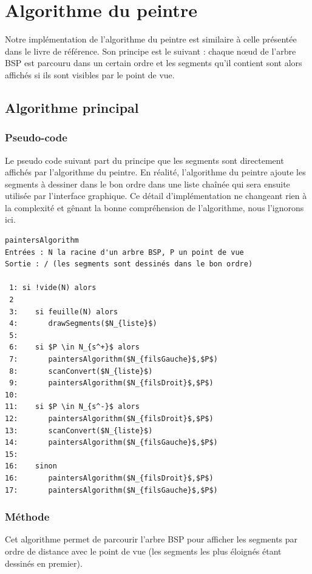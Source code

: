 \documentclass[11pt,a4paper]{article}
\theoremstyle{definition}
\theoremstyle{remark}
\begin{document}
\newpage

\section{Algorithme du peintre}

Notre implémentation de l'algorithme du peintre est similaire à celle présentée dans le livre de référence. Son principe est le suivant : chaque nœud de l'arbre BSP est parcouru dans un certain ordre et les segments qu'il contient sont alors affichés si ils sont visibles par le point de vue.

\subsection{Algorithme principal}
\subsubsection{Pseudo-code}
Le pseudo code suivant part du principe que les segments sont directement affichés par l'algorithme du peintre. En réalité, l'algorithme du peintre ajoute les segments à dessiner dans le bon ordre dans une liste chaînée qui sera ensuite utilisée par l'interface graphique. Ce détail d'implémentation ne changeant rien à la complexité et gênant la bonne compréhension de l'algorithme, nous l'ignorons ici.\\

\begin{lstlisting}
paintersAlgorithm
Entrées : N la racine d'un arbre BSP, P un point de vue
Sortie : / (les segments sont dessinés dans le bon ordre)

 1: si !vide(N) alors
 2
 3:    si feuille(N) alors
 4:       drawSegments($N_{liste}$)
 5:
 6:    si $P \in N_{s^+}$ alors
 7:       paintersAlgorithm($N_{filsGauche}$,$P$)
 8:       scanConvert($N_{liste}$)
 9:       paintersAlgorithm($N_{filsDroit}$,$P$)
10:
11:    si $P \in N_{s^-}$ alors
12:       paintersAlgorithm($N_{filsDroit}$,$P$)
13:       scanConvert($N_{liste}$)
14:       paintersAlgorithm($N_{filsGauche}$,$P$)
15:
16:    sinon
16:       paintersAlgorithm($N_{filsDroit}$,$P$)
17:       paintersAlgorithm($N_{filsGauche}$,$P$)
\end{lstlisting}

\subsubsection{Méthode}
Cet algorithme permet de parcourir l'arbre BSP pour afficher les segments par ordre de distance avec le point de vue (les segments les plus éloignés étant dessinés en premier).\\
\end{document}
